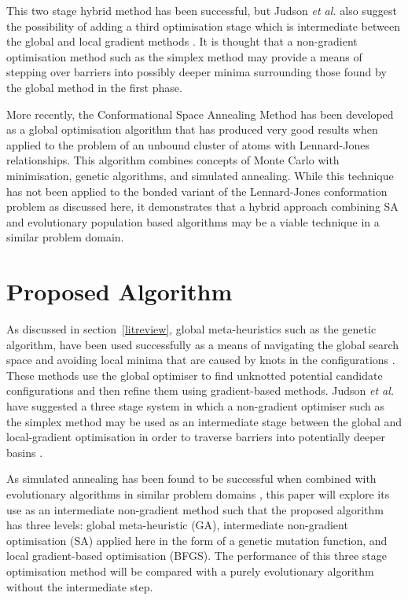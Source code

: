 \documentclass{article}
\begin{document}
This two stage hybrid method has been successful, but Judson \textit{et al.}
also suggest the possibility of adding a third optimisation stage which is
intermediate between the global and local gradient methods
\cite{doi:10.1002/qua.560440214}. It is thought that a non-gradient optimisation
method such as the simplex method may provide a means of stepping over barriers
into possibly deeper minima surrounding those found by the global method in the
first phase.

More recently, the Conformational Space Annealing Method
\cite{PhysRevLett.91.080201} has been developed as a global optimisation
algorithm that has produced very good results when applied to the problem of an
unbound cluster of atoms with Lennard-Jones relationships. This algorithm
combines concepts of Monte Carlo with minimisation, genetic algorithms, and
simulated annealing. While this technique has not been applied to the bonded
variant of the Lennard-Jones conformation problem as discussed here, it
demonstrates that a hybrid approach combining SA and evolutionary population
based algorithms may be a viable technique in a similar problem domain.

\section{Proposed Algorithm} \label{proposed}

As discussed in section~\ref{litreview}, global meta-heuristics such as the
genetic algorithm, have been used successfully as a means of navigating the
global search space and avoiding local minima that are caused by knots in the
configurations \cite{PULLAN1998331, doi:10.1002/qua.560440214}. These methods
use the global optimiser to find unknotted potential candidate configurations
and then refine them using gradient-based methods. Judson \textit{et al.} have
suggested a three stage system in which a non-gradient optimiser such as the
simplex method may be used as an intermediate stage between the global and
local-gradient optimisation in order to traverse barriers into potentially
deeper basins \cite{doi:10.1002/qua.560440214}.

As simulated annealing has been found to be successful when combined with
evolutionary algorithms in similar problem domains \cite{PhysRevLett.91.080201},
this paper will explore its use as an intermediate non-gradient method such that
the proposed algorithm has three levels: global meta-heuristic (GA),
intermediate non-gradient optimisation (SA) applied here in the form of a
genetic
mutation function, and local gradient-based optimisation (BFGS). The performance
of this three stage optimisation method will be compared with a purely
evolutionary algorithm without the intermediate step.
\end{document}
